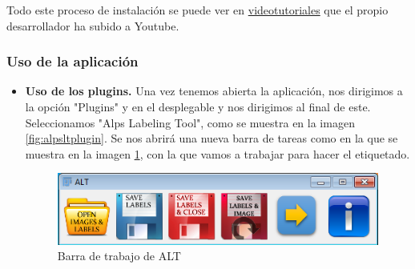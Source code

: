 Todo este proceso de instalación se puede ver en \href{https://www.youtube.com/watch?v=G6ib950iDvQ}{videotutoriales} que el propio desarrollador ha subido a Youtube.
\subsubsection{Uso de la aplicación}
\begin{itemize}
	\item \textbf{Uso de los plugins.} Una vez tenemos abierta la aplicación, nos dirigimos a la opción "Plugins" y en el desplegable y nos dirigimos al final de este. Seleccionamos "Alps Labeling Tool", como se muestra en la imagen \ref{fig:alpsltplugin}.
	Se nos abrirá una nueva barra de tareas como en la que se muestra en la imagen \ref{fig:alt}, con la que vamos a trabajar para hacer el etiquetado.
	\begin{figure}
		\centering
		\includegraphics[width=0.7\linewidth]{img/alt}
		\caption{Barra de trabajo de ALT}
		\label{fig:alt}
	\end{figure}
	

\end{itemize}

